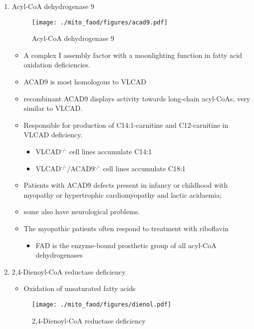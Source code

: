 \documentclass{scrartcl}
\begin{document}
\begin{enumerate}
\item Acyl-CoA dehydrogenase 9
\label{sec:org331a839}
\begin{figure}[htbp]
\centering
\texttt{[image: ./mito\_faod/figures/acad9.pdf]}
\caption{\label{fig:org319a13e}
Acyl-CoA dehydrogenase 9}
\end{figure}

\begin{itemize}
\item A complex I assembly factor with a moonlighting function in fatty
acid oxidation deficiencies.
\item ACAD9 is most homologous to VLCAD
\item recombinant ACAD9 displays activity towards long-chain acyl-CoAs,
very similar to VLCAD.
\item Responsible for production of C14:1-carnitine and C12-carnitine in
VLCAD deficiency.
\begin{itemize}
\item VLCAD\(^{\text{-/-}}\) cell lines accumulate C14:1
\item VLCAD\(^{\text{-/-}}\)/ACAD9\(^{\text{-/-}}\) cell lines accumulate C18:1
\end{itemize}
\item Patients with ACAD9 defects present in infancy or childhood with
myopathy or hypertrophic cardiomyopathy and lactic acidaemia;
\item some also have neurological problems.
\item The myopathic patients often respond to treatment with riboflavin
\begin{itemize}
\item FAD is the enzyme-bound prosthetic group of all acyl-CoA
dehydrogenases
\end{itemize}
\end{itemize}

\item 2,4-Dienoyl-CoA reductase deficiency
\label{sec:orgaca0583}
\begin{itemize}
\item Oxidation of unsaturated fatty acids
\end{itemize}

\begin{figure}[htbp]
\centering
\texttt{[image: ./mito\_faod/figures/dienol.pdf]}
\caption{\label{fig:org1d187a0}
2,4-Dienoyl-CoA reductase deficiency}
\end{figure}



\end{enumerate}
\end{document}
